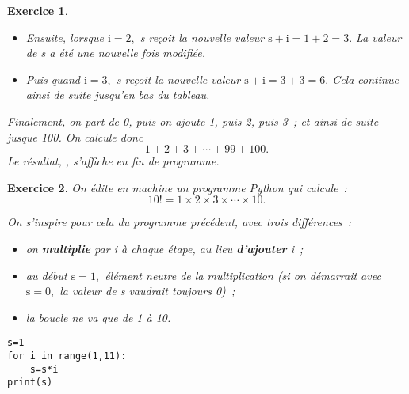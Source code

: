 \documentclass[10pt]{article}
\newtheorem{exo}{Exercice}
\begin{document}
\begin{exo}
\begin{multicols}{3}
\begin{itemize}
 Donc au début, lorsque $\text{i}=1,$ s reçoit la valeur $\text{s}+\text{i}=0+1=1.$ La valeur de s a donc été modifiée et il vaut maintenant 1 (et non plus 0).
\item[\textbullet] Ensuite, lorsque $\text{i}=2,$ s reçoit la nouvelle valeur $\text{s}+\text{i}=1+2=3.$ La valeur de s a été une nouvelle fois modifiée.
\item[\textbullet] Puis quand $\text{i}=3,$ s reçoit la nouvelle valeur $\text{s}+\text{i}=3+3=6.$ Cela continue ainsi de suite jusqu'en bas du tableau.
\end{itemize}
\end{multicols}

\medskip

Finalement, on part de 0, puis on ajoute 1, puis 2, puis 3~; et ainsi de suite jusque 100. On calcule donc
\[1+2+3+\cdots+ 99+100.\] Le résultat, , s'affiche en fin de programme.

\end{exo}


\begin{exo}

On édite en machine un programme Python qui calcule~:
\[10!=1\times 2\times 3\times \cdots\times 10.\]

On s'inspire pour cela du programme précédent, avec trois différences~:

\begin{itemize}
\item[\textbullet] on \textbf{multiplie} par i à chaque étape, au lieu \textbf{d'ajouter} i~;
\item[\textbullet] au début $\text{s}=1,$ élément neutre de la multiplication (si on démarrait avec $\text{s}=0,$ la valeur de s vaudrait toujours 0)~;
\item[\textbullet] la boucle ne va que de 1 à 10.
\end{itemize}

\medskip

\begin{lstlisting}
s=1
for i in range(1,11):
	s=s*i
print(s)
\end{lstlisting}


\end{exo}

\end{document}
